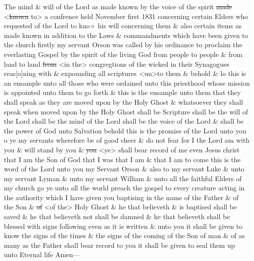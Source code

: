 {				The mind \& will of the Lord as made known by the voice of the spirit \sout{made} <\sout{known} to> a confrence held November first 1831 concerning certain Elders who requested of the Lord to kno$\diamond$ his will concerning them \& also certain items as made known in addition to the Laws \& commandments which have been given to the church firstly my servant Orson was called by his ordinance to proclaim the everlasting Gospel by the spirit of the living God from people to people \& from land to land \sout{from} <in the> congregtions of the wicked in their Synagogues reas[o]ning with \& expounding all scriptures <un>to them \& behold \& lo this is an ensample unto all those who were ordained unto this priesthood whose mission is appointed unto them to go forth \& this is the ensample unto them that they shall speak as they are moved upon by the Holy Ghost \& whatsoever they shall speak when moved upon by the Holy Ghost shall be Scripture shall be the will of the Lord shall be the mind of the Lord shall be the voice of the Lord \& shall be the power of God unto Salvation behold this is the promise of the Lord unto you o ye my servants wherefore be of good cheer \& do not fear for I the Lord am with you \& will stand by you \& \sout{you} <ye> shall bear record of me even Jesus christ that I am the Son of God that I was that I am \& that I am to come this is the word of the Lord unto you my Servant Orson \& also to my servant Luke \& unto my servant Lyman \& unto my servant William \& unto all the faithful Elders of my church go ye unto all the world preach the gospel to every creature acting in the authority which I have given you baptising in the name of the Father \& of the Son \& \sout{of} <of the> Holy Ghost \& he that believeth \& is baptised shall be saved \& he that believeth not shall be damned \& he that believeth shall be blessed with signs following even as it is written \& unto you it shall be given to know the signs of the times \& the signs of the coming of the Son of man \& of as many as the Father shall bear record to you it shall be given to seal them up unto Eternal life Amen---
				
}
